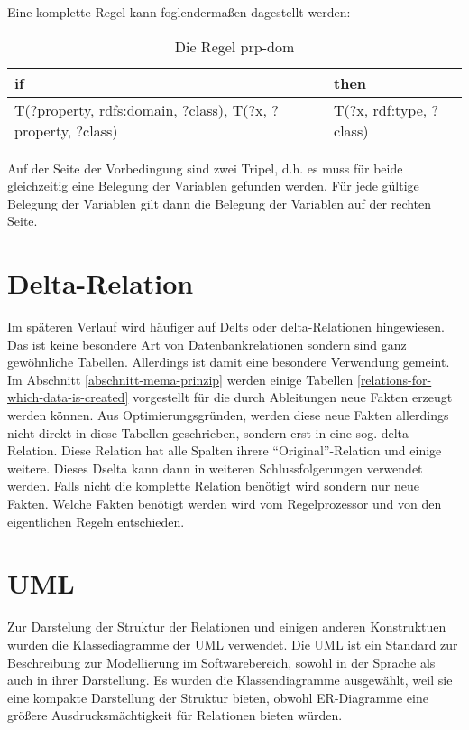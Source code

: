 Eine komplette Regel kann foglendermaßen dagestellt werden:

\begin{table}[htb]
\begin{center}
\begin{tabular}{m{6cm}|m{4cm}}
if & then \\ \hline
T(?property, rdfs:domain, ?class),\newline
T(?x, ?property, ?class) & T(?x, rdf:type, ?class)
\end{tabular}
\end{center}
\caption{Die Regel prp-dom}
\label{rule-prp-dom}
\end{table}

Auf der Seite der Vorbedingung sind zwei Tripel, d.h. es muss für beide gleichzeitig eine Belegung der Variablen gefunden werden. Für jede gültige Belegung der Variablen gilt dann die Belegung der Variablen auf der rechten Seite.

\section{Delta-Relation}
Im späteren Verlauf wird häufiger auf Delts oder delta-Relationen hingewiesen. Das ist keine besondere Art von Datenbankrelationen sondern sind ganz gewöhnliche Tabellen. Allerdings ist damit eine besondere Verwendung gemeint. Im Abschnitt \ref{abschnitt-mema-prinzip} werden einige Tabellen \ref{relations-for-which-data-is-created} vorgestellt für die durch Ableitungen neue Fakten erzeugt werden können. Aus Optimierungsgründen, werden diese neue Fakten allerdings nicht direkt in diese Tabellen geschrieben, sondern erst in eine sog. delta-Relation. Diese Relation hat alle Spalten ihrere ``Original''-Relation und einige weitere. Dieses Dselta kann dann in weiteren Schlussfolgerungen verwendet werden. Falls nicht die komplette Relation benötigt wird sondern nur neue Fakten. Welche Fakten benötigt werden wird vom Regelprozessor und von den eigentlichen Regeln entschieden.


\section{UML}
Zur Darstelung der Struktur der Relationen und einigen anderen Konstruktuen wurden die Klassediagramme der UML \cite{UML2} verwendet. Die UML ist ein Standard zur Beschreibung zur Modellierung im Softwarebereich, sowohl in der Sprache als auch in ihrer Darstellung. Es wurden die Klassendiagramme ausgewählt, weil sie eine kompakte Darstellung der Struktur bieten, obwohl ER-Diagramme eine größere Ausdrucksmächtigkeit für Relationen bieten würden. \cite{Martin2003}
